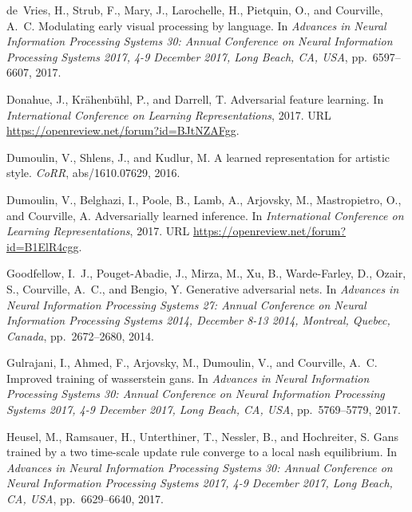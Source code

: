 \documentclass{article}
\begin{document}
\begin{multicols}{2}
{\begin{thebibliography}{36}
de~Vries, H., Strub, F., Mary, J., Larochelle, H., Pietquin, O., and Courville,
  A.~C.
\newblock Modulating early visual processing by language.
\newblock In \emph{Advances in Neural Information Processing Systems 30: Annual
  Conference on Neural Information Processing Systems 2017, 4-9 December 2017,
  Long Beach, CA, {USA}}, pp.\  6597--6607, 2017.

Donahue, J., Krähenbühl, P., and Darrell, T.
\newblock Adversarial feature learning.
\newblock In \emph{International Conference on Learning Representations}, 2017.
\newblock URL \url{https://openreview.net/forum?id=BJtNZAFgg}.

Dumoulin, V., Shlens, J., and Kudlur, M.
\newblock A learned representation for artistic style.
\newblock \emph{CoRR}, abs/1610.07629, 2016.

Dumoulin, V., Belghazi, I., Poole, B., Lamb, A., Arjovsky, M., Mastropietro,
  O., and Courville, A.
\newblock Adversarially learned inference.
\newblock In \emph{International Conference on Learning Representations}, 2017.
\newblock URL \url{https://openreview.net/forum?id=B1ElR4cgg}.

Goodfellow, I.~J., Pouget{-}Abadie, J., Mirza, M., Xu, B., Warde{-}Farley, D.,
  Ozair, S., Courville, A.~C., and Bengio, Y.
\newblock Generative adversarial nets.
\newblock In \emph{Advances in Neural Information Processing Systems 27: Annual
  Conference on Neural Information Processing Systems 2014, December 8-13 2014,
  Montreal, Quebec, Canada}, pp.\  2672--2680, 2014.

Gulrajani, I., Ahmed, F., Arjovsky, M., Dumoulin, V., and Courville, A.~C.
\newblock Improved training of wasserstein gans.
\newblock In \emph{Advances in Neural Information Processing Systems 30: Annual
  Conference on Neural Information Processing Systems 2017, 4-9 December 2017,
  Long Beach, CA, {USA}}, pp.\  5769--5779, 2017.

Heusel, M., Ramsauer, H., Unterthiner, T., Nessler, B., and Hochreiter, S.
\newblock Gans trained by a two time-scale update rule converge to a local nash
  equilibrium.
\newblock In \emph{Advances in Neural Information Processing Systems 30: Annual
  Conference on Neural Information Processing Systems 2017, 4-9 December 2017,
  Long Beach, CA, {USA}}, pp.\  6629--6640, 2017.


\end{thebibliography}}
\end{multicols}
\end{document}

